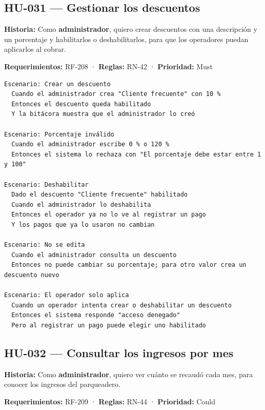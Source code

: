 \subsection{HU-031 — Gestionar los descuentos}

\textbf{Historia:} Como \textbf{administrador}, quiero crear descuentos con una descripción y un porcentaje y habilitarlos o deshabilitarlos, para que los operadores puedan aplicarlos al cobrar.


\textbf{Requerimientos:} RF-208 · \textbf{Reglas:} RN-42 · \textbf{Prioridad:} Must


\begin{lstlisting}[style=gherkin]
Escenario: Crear un descuento
  Cuando el administrador crea "Cliente frecuente" con 10 %
  Entonces el descuento queda habilitado
  Y la bitácora muestra que el administrador lo creó

Escenario: Porcentaje inválido
  Cuando el administrador escribe 0 % o 120 %
  Entonces el sistema lo rechaza con "El porcentaje debe estar entre 1 y 100"

Escenario: Deshabilitar
  Dado el descuento "Cliente frecuente" habilitado
  Cuando el administrador lo deshabilita
  Entonces el operador ya no lo ve al registrar un pago
  Y los pagos que ya lo usaron no cambian

Escenario: No se edita
  Cuando el administrador consulta un descuento
  Entonces no puede cambiar su porcentaje; para otro valor crea un descuento nuevo

Escenario: El operador solo aplica
  Cuando un operador intenta crear o deshabilitar un descuento
  Entonces el sistema responde "acceso denegado"
  Pero al registrar un pago puede elegir uno habilitado
\end{lstlisting}



\subsection{HU-032 — Consultar los ingresos por mes}

\textbf{Historia:} Como \textbf{administrador}, quiero ver cuánto se recaudó cada mes, para conocer los ingresos del parqueadero.


\textbf{Requerimientos:} RF-209 · \textbf{Reglas:} RN-44 · \textbf{Prioridad:} Could


